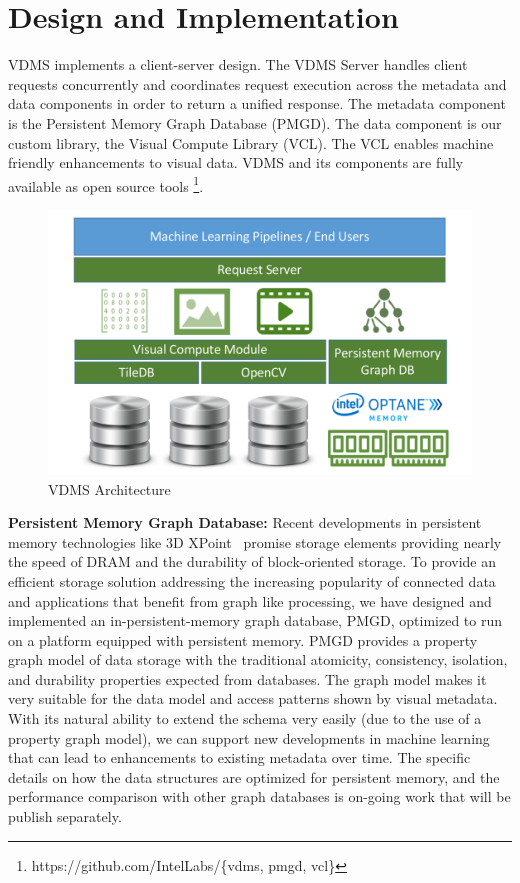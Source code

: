 \section{Design and Implementation}
\label{arch}

VDMS implements a client-server design.
The VDMS Server handles client requests concurrently and coordinates
request execution across the metadata and data components in order to return a
unified response. The metadata component is the Persistent Memory Graph
Database (PMGD). The data component is our custom library, the
Visual Compute Library (VCL). The VCL enables machine friendly enhancements to
visual data.
VDMS and its components are fully available as open source tools
\footnote{https://github.com/IntelLabs/\{vdms, pmgd, vcl\}}.

\begin{figure}[]
\centering
\includegraphics[width=1\columnwidth]{figures/vdms_arch.pdf}
\caption{VDMS Architecture}
\label{fig:arch}
\end{figure}

\textbf{Persistent Memory Graph Database:}
Recent developments in persistent memory technologies
like 3D XPoint~\cite{IntelXPoint15}
promise storage elements  providing  nearly  the  speed  of  DRAM  and  the
durability of block-oriented storage. To provide an efficient storage
solution addressing the increasing popularity of connected data and
applications that benefit from graph like processing, we have designed
and implemented an in-persistent-memory graph database, PMGD, optimized
to run on a platform equipped with persistent memory.
PMGD provides a property graph model of data storage with the traditional
atomicity, consistency, isolation, and durability properties expected from
databases. The graph model makes it very suitable for the data model and
access patterns shown by visual metadata.
With its natural ability to extend the schema very
easily (due to the use of a property graph model),
we can support new developments in machine learning that can lead to
enhancements to existing metadata over time.
The specific details on how the data structures are optimized for persistent
memory, and the performance comparison with other graph databases is on-going
work that will be publish separately.

